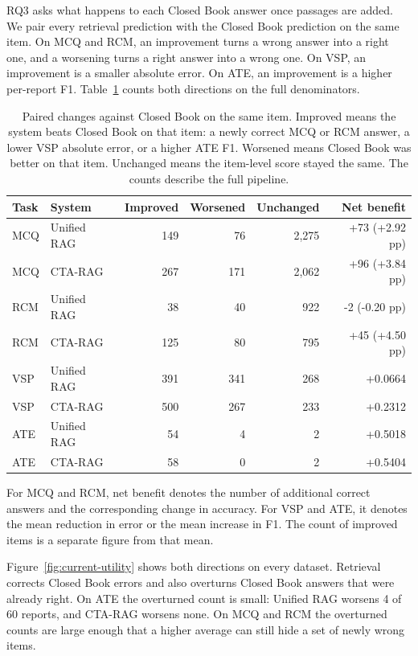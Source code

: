 \documentclass[5p,times,authoryear]{elsarticle}
\begin{document}
RQ3 asks what happens to each Closed Book answer once passages are added. We pair every retrieval prediction with the Closed Book prediction on the same item. On MCQ and RCM, an improvement turns a wrong answer into a right one, and a worsening turns a right answer into a wrong one. On VSP, an improvement is a smaller absolute error. On ATE, an improvement is a higher per-report F1. Table~\ref{tab:utility} counts both directions on the full denominators.

\begin{table}[t]
\centering
\small
\caption{Paired changes against Closed Book on the same item. Improved means the system beats Closed Book on that item: a newly correct MCQ or RCM answer, a lower VSP absolute error, or a higher ATE F1. Worsened means Closed Book was better on that item. Unchanged means the item-level score stayed the same. The counts describe the full pipeline.}
\label{tab:utility}
\setlength{\tabcolsep}{5pt}
\begin{tabular}{@{}llrrrr@{}}
\toprule
Task & System & Improved & Worsened & Unchanged & Net benefit \\
\midrule
MCQ & Unified RAG & 149 & 76  & 2,275 & +73 (+2.92 pp) \\
MCQ & CTA-RAG     & 267 & 171 & 2,062 & +96 (+3.84 pp) \\
RCM & Unified RAG & 38  & 40  & 922   & -2 (-0.20 pp) \\
RCM & CTA-RAG     & 125 & 80  & 795   & +45 (+4.50 pp) \\
VSP & Unified RAG & 391 & 341 & 268   & +0.0664 \\
VSP & CTA-RAG     & 500 & 267 & 233   & +0.2312 \\
ATE & Unified RAG & 54  & 4   & 2     & +0.5018 \\
ATE & CTA-RAG     & 58  & 0   & 2     & +0.5404 \\
\bottomrule
\end{tabular}
\par\smallskip
\footnotesize
For MCQ and RCM, net benefit denotes the number of additional correct
answers and the corresponding change in accuracy. For VSP and ATE, it
denotes the mean reduction in error or the mean increase in F1. The count of improved items is a separate figure from that mean.
\end{table}

Figure~\ref{fig:current-utility} shows both directions on every dataset. Retrieval corrects Closed Book errors and also overturns Closed Book answers that were already right. On ATE the overturned count is small: Unified RAG worsens 4 of 60 reports, and CTA-RAG worsens none. On MCQ and RCM the overturned counts are large enough that a higher average can still hide a set of newly wrong items.
\end{document}
